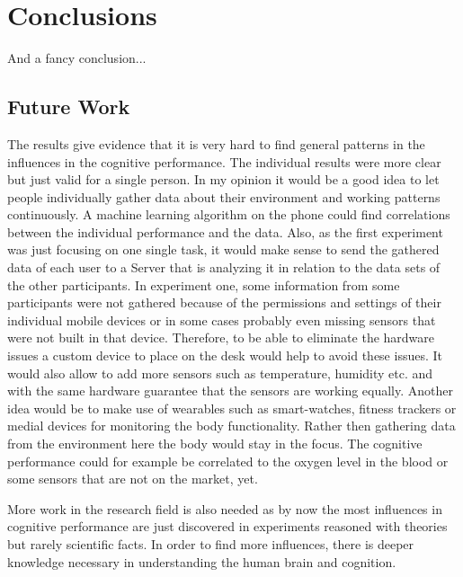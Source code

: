 \chapter{Conclusions}

And a fancy conclusion...


\section{Future Work}
The results give evidence that it is very hard to find general patterns in the influences in the cognitive performance. The individual results were more clear but just valid for a single person. 
In my opinion it would be a good idea to let people individually gather data about their environment and working patterns continuously. A machine learning algorithm on the phone could find correlations between the individual performance and the data. Also, as the first experiment was just focusing on one single task, it would make sense to send the gathered data of each user to a Server that is analyzing it in relation to the data sets of the other participants. 
In experiment one, some information from some participants were not gathered because of the permissions and settings of their individual mobile devices or in some cases probably even missing sensors that were not built in that device. 
Therefore, to be able to eliminate the hardware issues a custom device to place on the desk would help to avoid these issues. It would also allow to add more sensors such as temperature, humidity etc. and with the same hardware guarantee that the sensors are working equally. 
Another idea would be to make use of wearables such as smart-watches, fitness trackers or medial devices for monitoring the body functionality. Rather then gathering data from the environment here the body would stay in the focus. The cognitive performance could for example be correlated to the oxygen level in the blood or some sensors that are not on the market, yet. 

More work in the research field is also needed as by now the most influences in cognitive performance are just discovered in experiments reasoned with theories but rarely scientific facts. In order to find more influences, there is deeper knowledge necessary in understanding the human brain and cognition. 

